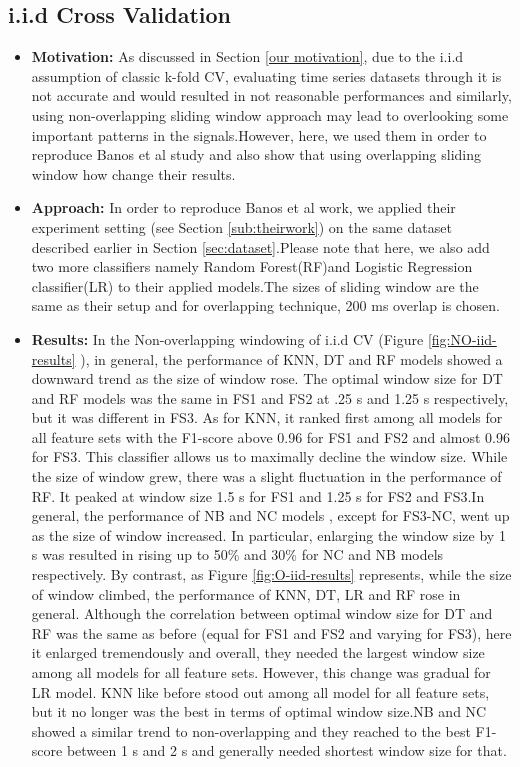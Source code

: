 \subsection{i.i.d Cross Validation}
\begin{itemize}
    \item[] \textbf{Motivation:} As discussed in Section \ref{our motivation}, due to the i.i.d assumption of classic k-fold CV, evaluating time series datasets through it is not accurate and would resulted in not reasonable performances and similarly, using non-overlapping sliding window approach may lead to overlooking some important patterns in the signals.However, here, we used them in order to reproduce Banos et al \cite{banos2014window} study and also show that using overlapping sliding window how change their results.
    
     \item[] \textbf{Approach:} In order to reproduce Banos et al \cite{banos2014window} work, we applied their experiment setting (see Section \ref{sub:theirwork}) on the same  dataset described earlier in Section \ref{sec:dataset}.Please note that here, we also add two more classifiers namely Random Forest(RF)and Logistic Regression classifier(LR) to their applied models.The sizes of sliding window are the same as their setup and for overlapping technique, 200 ms overlap is chosen.
     
     \item[] \textbf{Results:}
     In the Non-overlapping windowing of i.i.d CV (Figure \ref{fig:NO-iid-results} ), in general, the performance of KNN, DT and RF models showed a downward trend as the size of window rose. The optimal window size for DT and RF models was the same in FS1 and FS2 at .25 s and 1.25 s respectively, but it was different in FS3. As for KNN, it ranked first among all models for all feature sets with the F1-score above 0.96 for FS1 and FS2 and almost 0.96 for FS3. This classifier allows us to maximally decline the window size. While the size of window grew, there was a slight fluctuation in the performance of RF. It peaked at window size 1.5 s for FS1 and 1.25 s for FS2 and FS3.In general, the performance of NB and NC models , except for FS3-NC, went up as the size of window increased. In particular, enlarging the window size by 1 s was resulted in rising up to 50\% and 30\% for NC and NB models respectively.
 \newline
By contrast, as Figure \ref{fig:O-iid-results} represents, while the size of window climbed, the performance of KNN, DT, LR and RF rose in general. Although the correlation between optimal window size for DT and RF was the same as before (equal for FS1 and FS2 and varying for FS3), here it enlarged tremendously and overall, they needed the largest window size among all models for all feature sets. However, this change was gradual for LR model. KNN like before stood out among all model for all feature sets, but it no longer was the best in terms of optimal window size.NB and NC showed a similar trend to non-overlapping and they reached to the best F1-score between 1 s and 2 s and generally needed shortest window size for that.\newline
     

\end{itemize}
